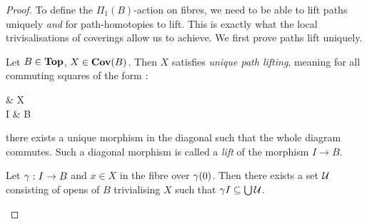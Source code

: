 \documentclass[./main.tex]{subfiles}
\begin{document}
\begin{proof}
  
  To define the $\Pi_1(B)$-action on fibres,
  we need to be able to lift paths uniquely \emph{and}
  for path-homotopies to lift. 
  This is exactly what the local trivisalisations of coverings 
  allow us to achieve.
  We first prove paths lift uniquely. 
  \begin{lem}
    Let $B \in \mathbf{Top}$, $X \in \mathbf{Cov}(B)$.
    Then $X$ satisfies \emph{unique path lifting},
    meaning for all commuting squares of the form : 
    \begin{cd}
      \bullet \ar[d,"0"{swap}] \ar[r]
        & X \ar[d] \\
      I \ar[r] \ar[ru,dashed,"!"]
        & B
    \end{cd}
    there exists a unique morphism in the diagonal 
    such that the whole diagram commutes. 
    Such a diagonal morphism is called a \emph{lift}
    of the morphism $I \to B$.
    \begin{proof1}
      Let $\gamma : I \to B$ and $x \in X$ in the fibre over $\gamma(0)$.
      Then there exists a set $\mathcal{U}$ consisting of opens of $B$
      trivialising $X$ such that $\gamma I \subseteq \bigcup \mathcal{U}$. 


\end{proof1}
\end{lem}
\end{proof}
\end{document}
